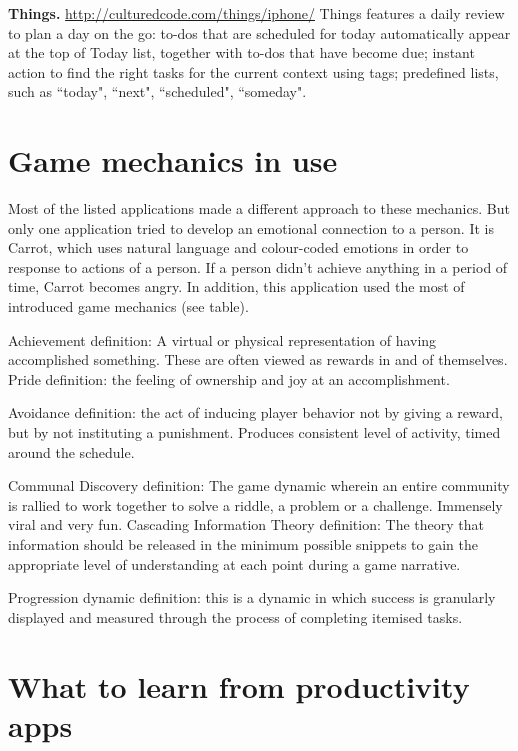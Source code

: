 \textbf{Things.} \url{http://culturedcode.com/things/iphone/} Things features a daily review to plan a day on the go: to-dos that are scheduled for today automatically appear at the top of Today list, together with to-dos that have become due; instant action to find the right tasks for the current context using tags; predefined lists, such as ``today", ``next", ``scheduled", ``someday".


\section{Game mechanics in use}

Most of the listed applications made a different approach to these mechanics. But only one application tried to develop an emotional connection to a person. It is Carrot, which uses natural language and colour-coded emotions in order to response to actions of a person. If a person didn’t achieve anything in a period of time, Carrot becomes angry. In addition, this application used the most of introduced game mechanics (see table).

Achievement definition: A virtual or physical representation of having accomplished something. These are often viewed as rewards in and of themselves.
Pride definition: the feeling of ownership and joy at an accomplishment.

Avoidance definition:  the act of inducing player behavior not by giving a reward, but by not instituting a punishment. Produces consistent level of activity, timed around the schedule.

Communal Discovery definition: The game dynamic wherein an entire community is rallied to work together to solve a riddle, a problem or a challenge. Immensely viral and very fun.
Cascading Information Theory definition: The theory that information should be released in the minimum possible snippets to gain the appropriate level of understanding at each point during a game narrative.

Progression dynamic definition: this is a dynamic in which success is granularly displayed and measured through the process of completing itemised tasks.

\section{What to learn from productivity apps}

